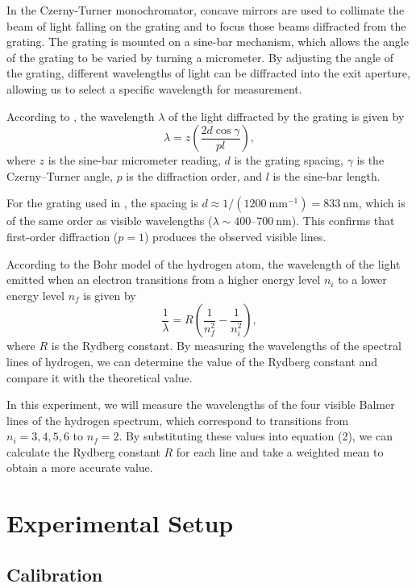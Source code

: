 \documentclass[12pt]{article}
\begin{document}
In the Czerny-Turner monochromator, concave mirrors are used to collimate the beam of light falling on the grating and to focus those beams diffracted from the grating. The grating is mounted on a sine-bar mechanism, which allows the angle of the grating to be varied by turning a micrometer. By adjusting the angle of the grating, different wavelengths of light can be diffracted into the exit aperture, allowing us to select a specific wavelength for measurement.

According to \cite{op13}, the wavelength $\lambda$ of the light diffracted by the grating is given by
\begin{equation}
\lambda = z\left( \frac{2d\cos\gamma}{pl} \right),
\end{equation}
where $z$ is the sine-bar micrometer reading, $d$ is the grating spacing, $\gamma$ is the Czerny--Turner angle, $p$ is the diffraction order, and $l$ is the sine-bar length.

For the grating used in \cite{op13}, the spacing is $d \approx 1/(1200~\mathrm{mm^{-1}})=833~\mathrm{nm}$, which is of the same order as visible wavelengths ($\lambda \sim 400$--$700~\mathrm{nm}$). This confirms that first-order diffraction ($p=1$) produces the observed visible lines.

According to the Bohr model of the hydrogen atom, the wavelength of the light emitted when an electron transitions from a higher energy level $n_i$ to a lower energy level $n_f$ is given by
\begin{equation}
\frac{1}{\lambda} = R \left( \frac{1}{n_f^2} - \frac{1}{n_i^2} \right),
\end{equation}
where $R$ is the Rydberg constant. By measuring the wavelengths of the spectral lines of hydrogen, we can determine the value of the Rydberg constant and compare it with the theoretical value.

In this experiment, we will measure the wavelengths of the four visible Balmer lines of the hydrogen spectrum, which correspond to transitions from $n_i = 3, 4, 5, 6$ to $n_f = 2$. By substituting these values into equation (2), we can calculate the Rydberg constant $R$ for each line and take a weighted mean to obtain a more accurate value.


\section{Experimental Setup}

\subsection{Calibration}
\end{document}

